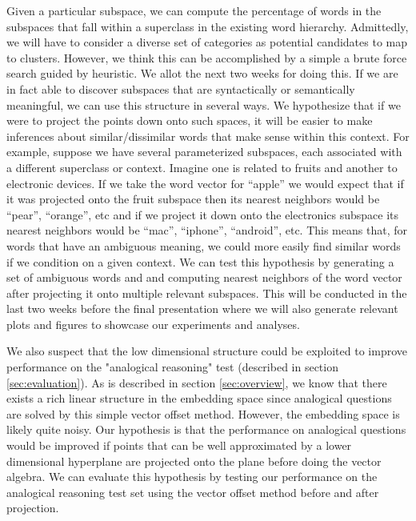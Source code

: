 Given a particular subspace, we can compute the percentage of words in the subspaces that fall within a superclass in the existing word hierarchy. 
Admittedly, we will have to consider a diverse set of categories as potential candidates to map to clusters. 
However, we think this can be accomplished by a simple a brute force search guided by heuristic. 
We allot the next two weeks for doing this. 
If we are in fact able to discover subspaces that are syntactically or semantically meaningful, we can use this structure in several ways. 
We hypothesize that if we were to project the points down onto such spaces, it will be easier to make inferences about similar/dissimilar words that make sense within this context. 
For example, suppose we have several parameterized subspaces, each associated with a different superclass or context. 
Imagine one is related to fruits and another to electronic devices. 
If we take the word vector for “apple” we would expect that if it was projected onto the fruit subspace then its nearest neighbors would be “pear”, “orange”, etc and if we project it down onto the electronics subspace its nearest neighbors would be “mac”, “iphone”, “android”, etc. 
This means that, for words that have an ambiguous meaning,  we could more easily find similar words if we condition on a given context. 
We can test this hypothesis by generating a set of ambiguous words and and computing nearest neighbors of the word vector after projecting it onto multiple relevant subspaces. 
This will be conducted in the last two weeks before the final presentation where we will also generate relevant plots and figures to showcase our experiments and analyses. 
 
We also suspect that the low dimensional structure could be exploited to improve performance on the "analogical reasoning" test (described in section \ref{sec:evaluation}). 
As is described in section \ref{sec:overview}, we know that there exists a rich linear structure in the embedding space since analogical questions are solved by this simple vector offset method. 
However, the embedding space is likely quite noisy. 
Our hypothesis is that the performance on analogical questions would be improved if points that can be well approximated by a lower dimensional hyperplane are projected onto the plane before doing the vector algebra. 
We can evaluate this hypothesis by testing our performance on the analogical reasoning test set using the vector offset method before and after projection. 

